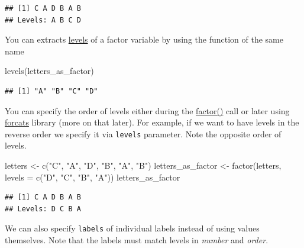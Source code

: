\documentclass[
]{book}
\newenvironment{Shaded}{\begin{snugshade}}{\end{snugshade}}
\newcommand{\AttributeTok}[1]{\textcolor[rgb]{0.77,0.63,0.00}{#1}}
\newcommand{\FunctionTok}[1]{\textcolor[rgb]{0.00,0.00,0.00}{#1}}
\newcommand{\NormalTok}[1]{#1}
\newcommand{\OtherTok}[1]{\textcolor[rgb]{0.56,0.35,0.01}{#1}}
\newcommand{\StringTok}[1]{\textcolor[rgb]{0.31,0.60,0.02}{#1}}
\begin{document}
\begin{verbatim}
## [1] C A D B A B
## Levels: A B C D
\end{verbatim}

You can extracts \href{https://stat.ethz.ch/R-manual/R-devel/library/base/html/levels.html}{levels} of a factor variable by using the function of the same name

\begin{Shaded}
\begin{Highlighting}[]
\FunctionTok{levels}\NormalTok{(letters\_as\_factor)}
\end{Highlighting}
\end{Shaded}

\begin{verbatim}
## [1] "A" "B" "C" "D"
\end{verbatim}

You can specify the order of levels either during the \href{https://stat.ethz.ch/R-manual/R-devel/library/base/html/factor.html}{factor()} call or later using \href{https://forcats.tidyverse.org/}{forcats} library (more on that later). For example, if we want to have levels in the reverse order we specify it via \texttt{levels} parameter. Note the opposite order of levels.

\begin{Shaded}
\begin{Highlighting}[]
\NormalTok{letters }\OtherTok{\textless{}{-}} \FunctionTok{c}\NormalTok{(}\StringTok{"C"}\NormalTok{, }\StringTok{"A"}\NormalTok{, }\StringTok{"D"}\NormalTok{, }\StringTok{"B"}\NormalTok{, }\StringTok{"A"}\NormalTok{, }\StringTok{"B"}\NormalTok{)}
\NormalTok{letters\_as\_factor }\OtherTok{\textless{}{-}} \FunctionTok{factor}\NormalTok{(letters, }\AttributeTok{levels =} \FunctionTok{c}\NormalTok{(}\StringTok{"D"}\NormalTok{, }\StringTok{"C"}\NormalTok{, }\StringTok{"B"}\NormalTok{, }\StringTok{"A"}\NormalTok{))}
\NormalTok{letters\_as\_factor}
\end{Highlighting}
\end{Shaded}

\begin{verbatim}
## [1] C A D B A B
## Levels: D C B A
\end{verbatim}

We can also specify \texttt{labels} of individual labels instead of using values themselves. Note that the labels must match levels in \emph{number} and \emph{order}.
\end{document}
